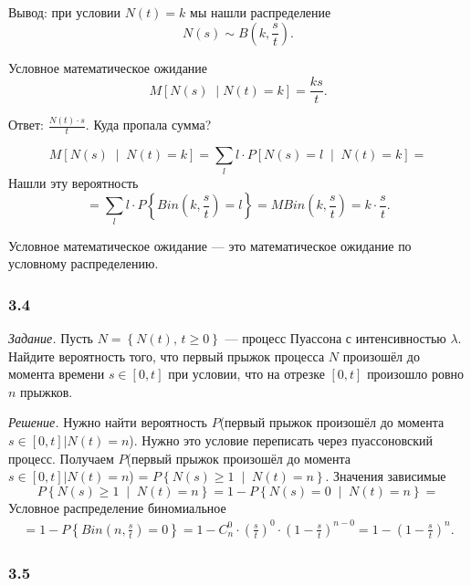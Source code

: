 Вывод: при условии $N \left( t \right) = k$ мы нашли распределение
$$N \left( s \right) \sim
  B \left( k, \frac{s}{t} \right).$$

Условное математическое ожидание
$$M \left[ N \left( s \right) \; \middle| N \left( t \right) = k \right] =
  \frac{ks}{t}.$$

Ответ: $ \frac{N \left( t \right) \cdot s}{t}$.
Куда пропала сумма?

$$M \left[ N \left( s \right) \; \middle| \; N \left( t \right) = k \right] =
  \sum \limits_l
    l \cdot P \left[ N \left( s \right) = l \; \middle| \; N \left( t \right) = k \right] =$$
Нашли эту вероятность
$$= \sum \limits_l l \cdot P \left\{ Bin \left( k, \frac{s}{t} \right) = l \right\} =
MBin \left( k, \frac{s}{t} \right) =
k \cdot \frac{s}{t}.$$

Условное математическое ожидание --- это математическое ожидание по условному распределению.

\subsubsection*{3.4}

\textit{Задание.}
Пусть $N = \left\{ N \left( t \right), \, t \geq 0 \right\} $ ---
процесс Пуассона с интенсивностью $ \lambda $.
Найдите вероятность того, что первый прыжок процесса $N$ произошёл до момента времени
$s \in \left[ 0, t \right] $ при условии,
что на отрезке $ \left[ 0, t \right] $ произошло ровно $n$ прыжков.

\textit{Решение.}
Нужно найти вероятность $P$(первый прыжок произошёл до момента
$\left. s \in \left[ 0, t \right] \right| N \left( t \right) = n$).
Нужно это условие переписать через пуассоновский процесс.
Получаем
$P$(первый прыжок произошёл до момента
  $\left. s \in \left[ 0, t \right] \right| N \left( t \right) = n$) =
  $P \left\{ N \left( s \right) \geq 1 \; \middle| \; N \left( t \right) = n \right\} $.
Значения зависимые
$$P \left\{ N \left( s \right) \geq 1 \; \middle| \; N \left( t \right) = n \right\} =
  1 - P \left\{ N \left( s \right) = 0 \; \middle| \; N \left( t \right) = n \right\} =$$
Условное распределение биномиальное
\begin{gather*}
  = 1 - P \left\{ Bin \left( n, \frac{s}{t} \right) = 0 \right\} =
  1 - C_n^0 \cdot \left( \frac{s}{t} \right)^0 \cdot \left( 1 - \frac{s}{t} \right)^{n - 0} =
  1 - \left( 1 - \frac{s}{t} \right)^n.
\end{gather*}

\subsubsection*{3.5}

